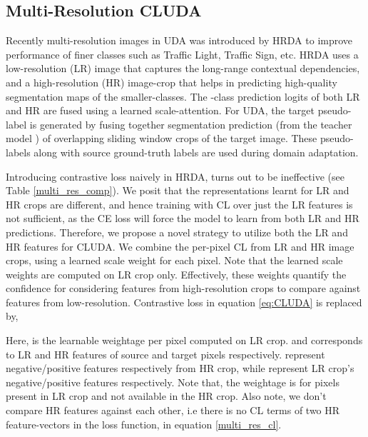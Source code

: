 \documentclass{article}
\begin{document}
\subsection{Multi-Resolution CLUDA}\label{sec:multi_res_da}

Recently multi-resolution images in UDA was introduced by HRDA\cite{hoyer2022hrda} to improve performance of finer classes such as Traffic Light, Traffic Sign, etc. HRDA uses a low-resolution (LR) image that captures the long-range contextual dependencies, and a high-resolution (HR) image-crop that helps in predicting high-quality segmentation maps of the smaller-classes. The -class prediction logits of both LR and HR are fused using a learned scale-attention. For UDA, the target pseudo-label is generated by fusing together segmentation prediction (from the teacher model \cite{hoyer2022hrda}) of overlapping sliding window crops of the target image. These pseudo-labels along with source ground-truth labels are used during domain adaptation.

Introducing contrastive loss naively in HRDA, turns out to be ineffective (see Table \ref{multi_res_comp}). We posit that the representations learnt for LR and HR crops are different, and hence training with CL over just the LR features is not sufficient, as the CE loss will force the model to learn from both LR and HR predictions. Therefore, we propose a novel strategy to utilize both the LR and HR features for CLUDA. We combine the per-pixel CL from LR and HR image crops, using a learned scale weight for each pixel. Note that the learned scale weights are computed on LR crop only. Effectively, these weights quantify the confidence for considering features from high-resolution crops to compare against features from low-resolution. Contrastive loss in equation \ref{eq:CLUDA} is replaced by, 

Here,  is the learnable weightage per pixel computed on LR crop.  and  corresponds to LR and HR features of source and target pixels respectively.  represent negative/positive features respectively from HR crop, while  represent LR crop's negative/positive features respectively.  Note that, the weightage is  for pixels present in LR crop and not available in the HR crop. Also note, we don't compare HR features against each other, i.e there is no CL terms of two HR feature-vectors in the loss function, in equation \ref{multi_res_cl}. 
\end{document}
